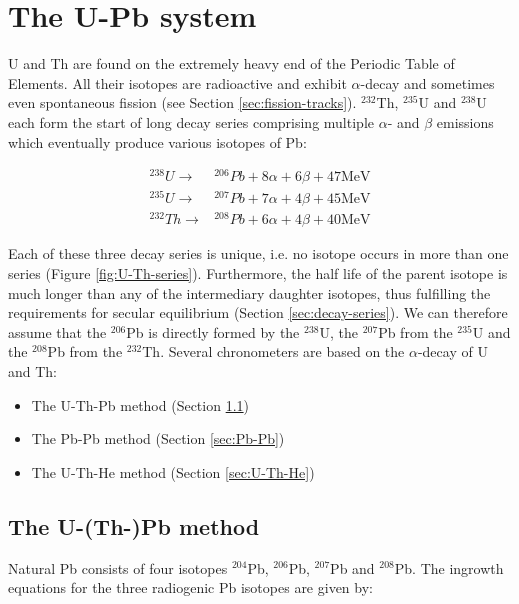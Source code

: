 \chapter{The U-Pb system}
\label{sec:U-Pb}

U and Th are found on the extremely heavy end of the Periodic Table of
Elements.  All their isotopes are radioactive and exhibit
$\alpha$-decay and sometimes even spontaneous fission (see Section
\ref{sec:fission-tracks}). $^{232}$Th, $^{235}$U and $^{238}$U each
form the start of long decay series comprising multiple $\alpha$- and
$\beta$ emissions which eventually produce various isotopes of Pb:

\begin{equation}
\begin{array}{rl}
^{238}U \rightarrow & {}^{206}Pb + 8\alpha + 6\beta + 47\mbox{MeV} \\ 
^{235}U \rightarrow & {}^{207}Pb + 7\alpha + 4\beta + 45\mbox{MeV} \\
^{232}Th \rightarrow & {}^{208}Pb + 6\alpha + 4\beta + 40\mbox{MeV} 
\end{array}
\label{eq:UThdecay}
\end{equation}

Each of these three decay series is unique, i.e. no isotope occurs in
more than one series (Figure \ref{fig:U-Th-series}). Furthermore, the
half life of the parent isotope is much longer than any of the
intermediary daughter isotopes, thus fulfilling the requirements for
secular equilibrium (Section \ref{sec:decay-series}). We can therefore
assume that the $^{206}$Pb is directly formed by the $^{238}$U, the
$^{207}$Pb from the $^{235}$U and the $^{208}$Pb from the
$^{232}$Th. Several chronometers are based on the $\alpha$-decay of U
and Th:

\begin{itemize}
\item The U-Th-Pb method (Section \ref{sec:U-Th-Pb})
\item The Pb-Pb method (Section \ref{sec:Pb-Pb})
\item The U-Th-He method (Section \ref{sec:U-Th-He})
\end{itemize}

\section{The U-(Th-)Pb method}
\label{sec:U-Th-Pb}

Natural Pb consists of four isotopes $^{204}$Pb, $^{206}$Pb,
$^{207}$Pb and $^{208}$Pb. The ingrowth equations for
the three radiogenic Pb isotopes are given by:

